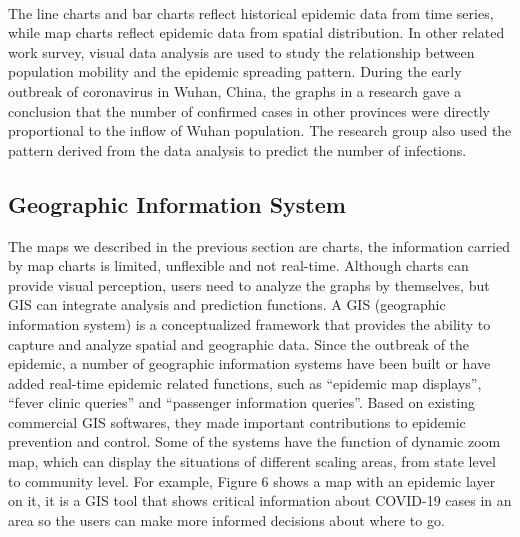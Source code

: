 \documentclass[sigplan,screen]{acmart}
\begin{document}
\\
The line charts and bar charts reflect historical epidemic data from time series, while map charts reflect epidemic data from spatial distribution.
In other related work survey, visual data analysis are used to study the relationship between population mobility and the epidemic spreading pattern.
During the early outbreak of coronavirus in Wuhan, China, the graphs in a research gave a conclusion that the number of confirmed cases in other provinces were directly proportional to the inflow of Wuhan population.
The research group also used the pattern derived from the data analysis to predict the number of infections.\cite{chen2020data}
\subsection{Geographic Information System}
The maps we described in the previous section are charts, the information carried by map charts is limited, unflexible and not real-time.
Although charts can provide visual perception, users need to analyze the graphs by themselves, but GIS can integrate analysis and prediction functions.
A GIS (geographic information system) is a conceptualized framework that provides the ability to capture and analyze spatial and geographic data\cite{clarke1986advances}.
Since the outbreak of the epidemic, a number of geographic information systems have been built or have added real-time epidemic related functions, such as ``epidemic map displays'', ``fever clinic queries'' and ``passenger information queries''.
Based on existing commercial GIS softwares, they made important contributions to epidemic prevention and control\cite{zhou2020covid}.
Some of the systems have the function of dynamic zoom map, which can display the situations of different scaling areas, from state level to community level.
For example, Figure 6 shows a map with an epidemic layer on it, it is a GIS tool that shows critical information about COVID-19 cases in an area so the users can make more informed decisions about where to go.
\end{document}
